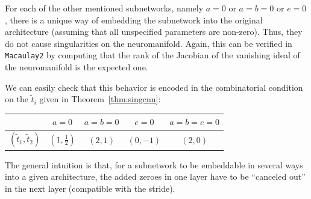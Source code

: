 \documentclass{article} %
\theoremstyle{plain}%
\theoremstyle{definition}
\theoremstyle{remark}
\begin{document}
For each of the other mentioned subnetworks, namely $a=0$ or $a=b=0$ or $e=0$, there is a unique way of embedding the subnetwork into the original architecture (assuming that all unspecified parameters are non-zero). Thus, they do not cause singularities on the neuromanifold. Again, this can be verified in \texttt{Macaulay2} by computing that the rank of the Jacobian of the vanishing ideal of the neuromanifold is the expected one. 

We can easily check that this behavior is encoded in the combinatorial condition on the $\tilde t_i$ given in Theorem~\ref{thm:singcnn}:
\begin{center}
\vspace{.3em}
\renewcommand{\arraystretch}{1.4}
\begin{tabular}{c|c|c|c|c}
     & $a=0$ & $a=b=0$ & $e=0$ & $a=b=e=0$ \\\hline
   $(\tilde t_1, \tilde t_2)$  & $(1, \frac{1}{2})$ & $(2, 1)$ & $(0, -1)$ & $(2,0)$ 
\end{tabular}
\end{center}
The general intuition is that, for a subnetwork to be embeddable in several ways into a given architecture, the added zeroes in one layer have to be ``canceled out'' in the next layer (compatible with the stride). 
\end{document}
